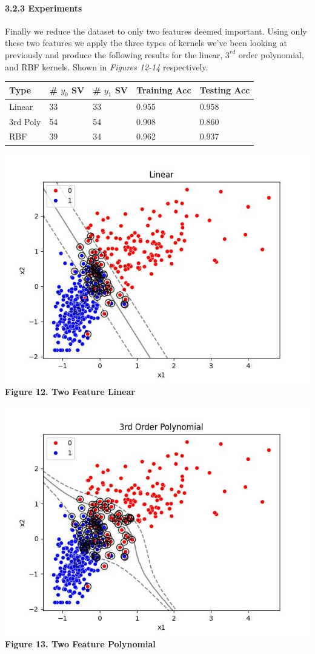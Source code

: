 \documentclass[11pt]{article}
\begin{document}
\hypertarget{experiments-2}{%
\paragraph{3.2.3 Experiments}\label{experiments-2}}

Finally we reduce the dataset to only two features deemed important.
Using only these two features we apply the three types of kernels we've
been looking at previously and produce the following results for the
linear, \(3^{rd}\) order polynomial, and RBF kernels. Shown in
\emph{Figures 12-14} respectively.

\begin{longtable}[]{@{}lllll@{}}
\toprule
Type & \# \(y_{0}\) SV & \# \(y_{1}\) SV & Training Acc & Testing Acc \\
\midrule
\endhead
Linear & 33 & 33 & 0.955 & 0.958 \\
3rd Poly & 54 & 54 & 0.908 & 0.860 \\
RBF & 39 & 34 & 0.962 & 0.937 \\
\bottomrule
\end{longtable}

\includegraphics{figures/3_2_3_linear.jpg}\\
\textbf{Figure 12. Two Feature Linear}

\includegraphics{figures/3_2_3_poly.jpg}\\
\textbf{Figure 13. Two Feature Polynomial}
\end{document}
